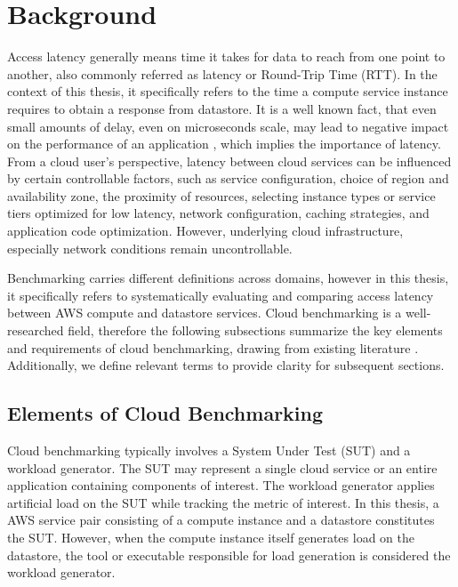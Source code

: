 \section{Background}
\label{cha:background}

Access latency generally means time it takes for data to reach from one point to another, also commonly referred as latency or Round-Trip Time (RTT). In the context of this thesis, it specifically refers to the time a compute service instance requires to obtain a response from datastore. It is a well known fact, that even small amounts of delay, even on microseconds scale, may lead to negative impact on the performance of an application \cite{}, which implies the importance of latency.
%
From a cloud user's perspective, latency between cloud services can be influenced by certain controllable factors, such as service configuration, choice of region and availability zone, the proximity of resources, selecting instance types or service tiers optimized for low latency, network configuration, caching strategies, and application code optimization. However, underlying cloud infrastructure, especially network conditions remain uncontrollable.

Benchmarking carries different definitions across domains, however in this thesis, it specifically refers to systematically evaluating and comparing access latency between AWS compute and datastore services. Cloud benchmarking is a well-researched field, therefore the following subsections summarize the key elements and requirements of cloud benchmarking, drawing from existing literature \cite{paper_binnig_weather,paper_cooper_ycsb,paper_folkerts_benchmarking,book_bermbach_cloud_service_benchmarking}. Additionally, we define relevant terms to provide clarity for subsequent sections.

\subsection{Elements of Cloud Benchmarking}
\label{elems_of_bench}

Cloud benchmarking typically involves a System Under Test (SUT) and a workload generator. The SUT may represent a single cloud service or an entire application containing components of interest. The workload generator applies artificial load on the SUT while tracking the metric of interest. In this thesis, a AWS service pair consisting of a compute instance and a datastore constitutes the SUT. However, when the compute instance itself generates load on the datastore, the tool or executable responsible for load generation is considered the workload generator.

